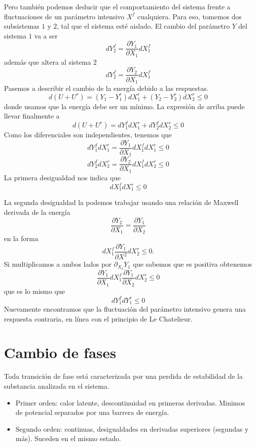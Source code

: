 \documentclass{book}
\numberwithin{equation}{section} %
\begin{document}
Pero también podemos deducir que el comportamiento del sistema frente a fluctuaciones de un parámetro intensivo $X^f$ cualquiera.
Para eso, tomemos dos subsistemas $1$ y $2$, tal que el sistema esté aislado.
El cambio del parámetro $Y$ del sistema $1$ va a ser
\[dY^f_2 = \frac{\partial Y_1}{\partial X_1} dX^f_1\]
además que altera al sistema $2$
\[ dY^f_2 = \frac{\partial Y_2}{\partial X_1} dX^f_1\]
Pasemos a describir el cambio de la energía debido a las respuestas.
\[d(U + U^r) = (Y_1 - Y^r_1) dX^r_1 + (Y_2 - Y^r_2) dX^r_2 \leq 0 \]
donde usamos que la energía debe ser un mínimo.
La expresión de arriba puede llevar finalmente a
\[ d(U + U^r) = dY^f_1 dX^r_1 + dY^f_2 dX^r_2 \leq 0\]
Como los diferenciales son independientes, tenemos que
\[dY^f_1 dX^r_1 = \frac{\partial Y_1}{\partial X_1} dX^f_1 dX^r_1 \leq 0\]
\[dY^f_2 dX^r_2 = \frac{\partial Y_2}{\partial X_1} dX^f_1 dX^r_2 \leq 0\]
La primera desigualdad nos indica que
\begin{equation}
dX^f_1 dX^r_1 \leq 0
\end{equation}

La segunda desigualdad la podemos trabajar usando una relación de Maxwell derivada de la energía
\[ \frac{\partial Y_2}{\partial X_1} = \frac{\partial Y_1}{\partial X_2}\]
en la forma
\[dX^f_1 \frac{\partial Y_1}{\partial X^2} dX^r_2 \leq 0.\]
Si multiplicamos a ambos lados por $\partial_{X_1} Y_1$ que sabemos que es positiva obtenemos
\[\frac{\partial Y_1}{\partial X_1} dX^f_1 \frac{\partial Y_1}{\partial X_2} dX^r_2 \leq 0\]
que es lo mismo que
\begin{equation}
dY^f_1 dY^r_1 \leq 0
\end{equation}
Nuevamente encontramos que la fluctuación del parámetro intensivo genera una respuesta contraria, en línea con el principio de Le Chatelieur.

\section{Cambio de fases}
Toda transición de fase está caracterizada por una perdida de estabilidad de la substancia analizada en el sistema.
\begin{itemize}
\item Primer orden: calor latente, descontinuidad en primeras derivadas. Minimos de potencial separados por una barrera de energía.
\item Segundo orden: continuas, desigualdades en derivadas superiores (segundas y más). Suceden en el mismo estado.
\end{itemize}
\end{document}
